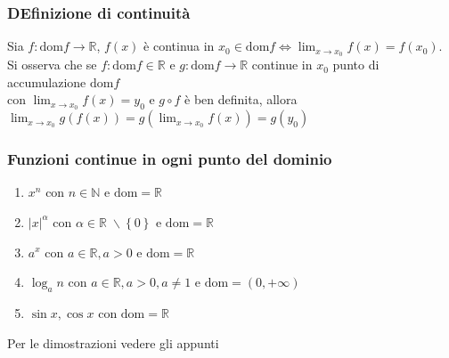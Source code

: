 \documentclass[a4paper]{article}
\newcommand\dom{\text{dom}}
\begin{document}
\subsubsection*{DEfinizione di continuità}
Sia \(f: \dom f \to \mathbb{R}\), \(f(x)\) è continua in \(x_0 \in \dom f \Leftrightarrow \displaystyle \lim_{x \to x_0} f(x) = f(x_0)\). \\
Si osserva che se \(f: \dom f \in \mathbb{R}\) e \(g: \dom f \to \mathbb{R}\) continue in \(x_0\) punto di accumulazione \(\dom f\) \\ 
con \(\displaystyle \lim_{x \to x_0} f(x) = y_0\) e \(g \circ f\) è ben definita, allora \(\displaystyle \lim_{x \to x_0} g(f(x)) = g\left( \lim_{x \to x_0} f(x) \right) = g(y_0)\)

\subsubsection*{Funzioni continue in ogni punto del dominio}
\begin{enumerate}
	\item \(x^n\) con \(n \in \mathbb{N}\) e \(\dom = \mathbb{R}\)
	\item \(\left| x \right| ^ \alpha\) con \(\alpha \in \mathbb{R} \; \backslash \left\{ 0 \right\}\) e \(\dom = \mathbb{R}\)
	\item \(a^x\) con \(a \in \mathbb{R}, a > 0\) e \(\dom = \mathbb{R}\)
	\item \(\log_a n\) con \(a \in \mathbb{R}, a > 0, a \neq 1\) e \(\dom = \left(0, + \infty \right)\)
	\item \(\sin x, \cos x\) con \(\dom = \mathbb{R}\)
\end{enumerate}
Per le dimostrazioni vedere gli appunti
\end{document}
